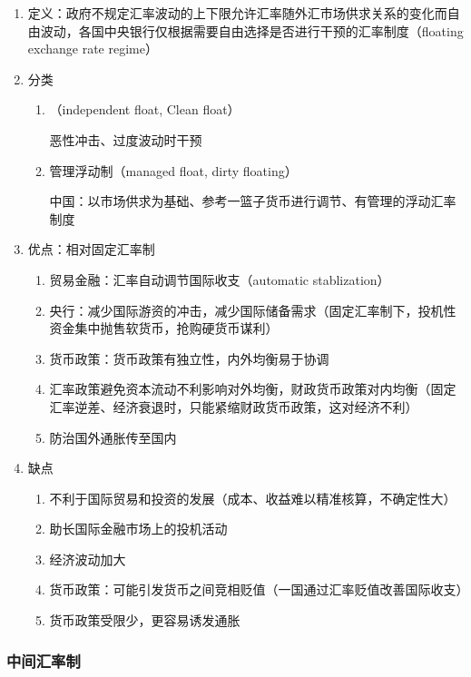 \documentclass[12pt]{book}
\begin{document}
\begin{enumerate}[1.]
    \item 定义：政府不规定汇率波动的上下限允许汇率随外汇市场供求关系的变化而自由波动，各国中央银行仅根据需要自由选择是否进行干预的汇率制度（floating exchange rate regime）
    \item 分类
          \begin{enumerate}[(1)]
              \item （independent float, Clean float）
                    \par 恶性冲击、过度波动时干预
              \item 管理浮动制（managed float, dirty floating）
                    \par 中国：以市场供求为基础、参考一篮子货币进行调节、有管理的浮动汇率制度
          \end{enumerate}
    \item 优点：相对固定汇率制
          \begin{enumerate}[(1)]
              \item 贸易金融：汇率自动调节国际收支（automatic stablization）
              \item 央行：减少国际游资的冲击，减少国际储备需求（固定汇率制下，投机性资金集中抛售软货币，抢购硬货币谋利）
              \item 货币政策：货币政策有独立性，内外均衡易于协调
              \item 汇率政策避免资本流动不利影响对外均衡，财政货币政策对内均衡（固定汇率逆差、经济衰退时，只能紧缩财政货币政策，这对经济不利）
              \item 防治国外通胀传至国内
          \end{enumerate}
    \item 缺点
          \begin{enumerate}[(1)]
              \item 不利于国际贸易和投资的发展（成本、收益难以精准核算，不确定性大）
              \item 助长国际金融市场上的投机活动
              \item 经济波动加大
              \item 货币政策：可能引发货币之间竞相贬值（一国通过汇率贬值改善国际收支）
              \item 货币政策受限少，更容易诱发通胀
          \end{enumerate}
\end{enumerate}




\subsubsection{中间汇率制}
\end{document}
